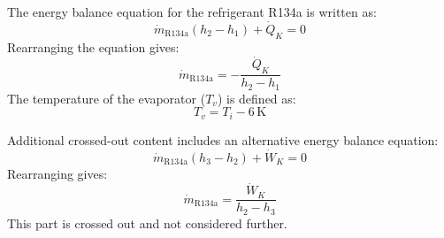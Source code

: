 The energy balance equation for the refrigerant R134a is written as:  
\[
\dot{m}_{\text{R134a}} (h_2 - h_1) + \dot{Q}_K = 0
\]  
Rearranging the equation gives:  
\[
\dot{m}_{\text{R134a}} = -\frac{\dot{Q}_K}{h_2 - h_1}
\]  
The temperature of the evaporator (\( T_v \)) is defined as:  
\[
T_v = T_i - 6 \, \text{K}
\]  

Additional crossed-out content includes an alternative energy balance equation:  
\[
\dot{m}_{\text{R134a}} (h_3 - h_2) + \dot{W}_K = 0
\]  
Rearranging gives:  
\[
\dot{m}_{\text{R134a}} = \frac{\dot{W}_K}{h_2 - h_3}
\]  
This part is crossed out and not considered further.